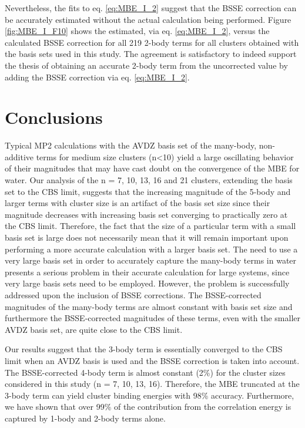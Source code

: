 \documentclass[11pt, proquest]{uwthesis}[2020/02/24]
\newcommand{\textapprox}{\raisebox{0.5ex}{\texttildelow}}
\begin{document}


\par Nevertheless, the fits to eq. \eqref{eq:MBE_I_2} suggest that the BSSE correction can be accurately estimated without the actual calculation being performed. Figure \ref{fig:MBE_I_F10} shows the estimated, via eq. \eqref{eq:MBE_I_2}, versus the calculated BSSE correction for all 219 2-body terms for all clusters obtained with the basis sets used in this study. The agreement is satisfactory to indeed support the thesis of obtaining an accurate 2-body term from the uncorrected value by adding the BSSE correction via eq. \eqref{eq:MBE_I_2}.

\section{Conclusions}\label{sec:3_conclusions}

\par Typical MP2 calculations with the AVDZ basis set of the many-body, non-additive terms for medium size clusters (n\textless 10) yield a large oscillating behavior of their magnitudes that may have cast doubt on the convergence of the MBE for water. Our analysis of the n = 7, 10, 13, 16 and 21 clusters, extending the basis set to the CBS limit, suggests that the increasing magnitude of the 5-body and larger terms with cluster size is an artifact of the basis set size since their magnitude decreases with increasing basis set converging to practically zero at the CBS limit. Therefore, the fact that the size of a particular term with a small basis set is large does not necessarily mean that it will remain important upon performing a more accurate calculation with a larger basis set. The need to use a very large basis set in order to accurately capture the many-body terms in water presents a serious problem in their accurate calculation for large systems, since very large basis sets need to be employed. However, the problem is successfully addressed upon the inclusion of BSSE corrections. The BSSE-corrected magnitudes of the many-body terms are almost constant with basis set size and furthermore the BSSE-corrected magnitudes of these terms, even with the smaller AVDZ basis set, are quite close to the CBS limit. 

\par Our results suggest that the 3-body term is essentially converged to the CBS limit when an AVDZ basis is used and the BSSE correction is taken into account. The BSSE-corrected 4-body term is almost constant (\textapprox2\%) for the cluster sizes considered in this study (n = 7, 10, 13, 16). Therefore, the MBE truncated at the 3-body term can yield cluster binding energies with \textapprox98\% accuracy. Furthermore, we have shown that over 99\% of the contribution from the correlation energy is captured by 1-body and 2-body terms alone.
\end{document}
